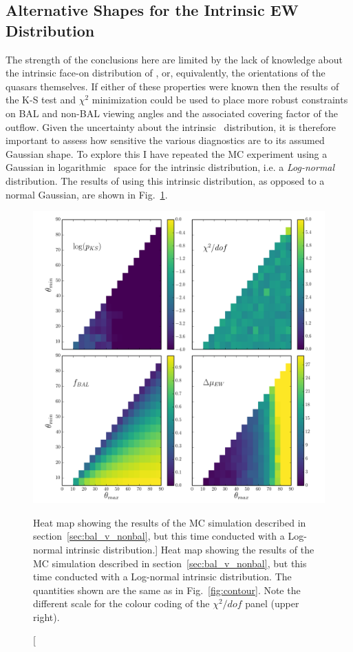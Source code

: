 \subsection{Alternative Shapes for the Intrinsic EW Distribution}

The strength of the conclusions here are limited by the lack of knowledge about the 
intrinsic face-on distribution of \ewo, or, equivalently,
the orientations of the quasars themselves. 
If either of these properties were known then the results of the
K-S test and $\chi^2$ minimization could be used
to place more robust constraints on BAL and non-BAL viewing angles 
and the associated covering factor of the outflow.
Given the uncertainty about the intrinsic \ewo\ distribution, 
it is therefore important to assess how sensitive 
the various diagnostics are to its assumed Gaussian shape. 
To explore this I have repeated the MC experiment
using a Gaussian in logarithmic \ewo\ space for the intrinsic distribution, i.e.
a {\em Log-normal} distribution. The results of using this intrinsic distribution,
as opposed to a normal Gaussian, are shown in Fig.~\ref{fig:contour2}.

\begin{figure} %
\centering
\includegraphics[width=1.0\textwidth]{figures/ewpaper/mesh4_ew_o3_max_sdds_logn.png}
\caption
[Heat map showing the results of the MC simulation described in 
section~\ref{sec:bal_v_nonbal}, but this time conducted with a Log-normal 
intrinsic distribution.]
{
Heat map showing the results of the MC simulation described in 
section~\ref{sec:bal_v_nonbal}, but this time conducted with a Log-normal 
intrinsic distribution. The quantities shown are the same 
as in Fig.~\ref{fig:contour}. Note the different scale for the colour coding
of the $\chi^2/dof$ panel (upper right).
}
\label{fig:contour2}
\end{figure} %


